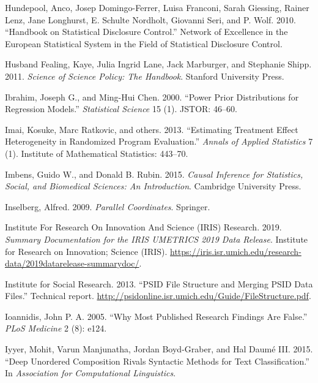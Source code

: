 \documentclass[]{krantz}
\begin{document}
\hypertarget{ref-hundepool2010handbook}{}
Hundepool, Anco, Josep Domingo-Ferrer, Luisa Franconi, Sarah Giessing,
Rainer Lenz, Jane Longhurst, E. Schulte Nordholt, Giovanni Seri, and P.
Wolf. 2010. ``Handbook on Statistical Disclosure Control.'' Network of
Excellence in the European Statistical System in the Field of
Statistical Disclosure Control.

\hypertarget{ref-husband2011science}{}
Husband Fealing, Kaye, Julia Ingrid Lane, Jack Marburger, and Stephanie
Shipp. 2011. \emph{Science of Science Policy: The Handbook}. Stanford
University Press.

\hypertarget{ref-ibrahim2000power}{}
Ibrahim, Joseph G., and Ming-Hui Chen. 2000. ``Power Prior Distributions
for Regression Models.'' \emph{Statistical Science} 15 (1). JSTOR:
46--60.

\hypertarget{ref-imai2013estimating}{}
Imai, Kosuke, Marc Ratkovic, and others. 2013. ``Estimating Treatment
Effect Heterogeneity in Randomized Program Evaluation.'' \emph{Annals of
Applied Statistics} 7 (1). Institute of Mathematical Statistics:
443--70.

\hypertarget{ref-imbens2015causal}{}
Imbens, Guido W., and Donald B. Rubin. 2015. \emph{Causal Inference for
Statistics, Social, and Biomedical Sciences: An Introduction}. Cambridge
University Press.

\hypertarget{ref-inselberg2009}{}
Inselberg, Alfred. 2009. \emph{Parallel Coordinates}. Springer.

\hypertarget{ref-InstituteForResearchOnInnovationAndScienceIRISResearch2019}{}
Institute For Research On Innovation And Science (IRIS) Research. 2019.
\emph{Summary Documentation for the IRIS UMETRICS 2019 Data Release}.
Institute for Research on Innovation; Science (IRIS).
\url{https://iris.isr.umich.edu/research-data/2019datarelease-summarydoc/}.

\hypertarget{ref-PSIDguide}{}
Institute for Social Research. 2013. ``PSID File Structure and Merging
PSID Data Files.'' Technical report.
\url{http://psidonline.isr.umich.edu/Guide/FileStructure.pdf}.

\hypertarget{ref-Ioannidis2005}{}
Ioannidis, John P. A. 2005. ``Why Most Published Research Findings Are
False.'' \emph{PLoS Medicine} 2 (8): e124.

\hypertarget{ref-iyyer-15}{}
Iyyer, Mohit, Varun Manjunatha, Jordan Boyd-Graber, and Hal Daumé III.
2015. ``Deep Unordered Composition Rivals Syntactic Methods for Text
Classification.'' In \emph{Association for Computational Linguistics}.
\end{document}
